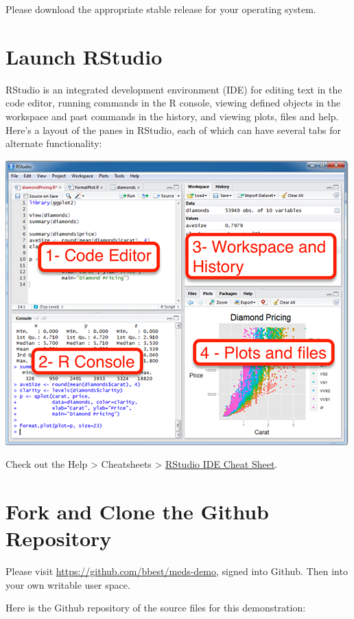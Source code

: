 \documentclass[]{book}
\begin{document}
Please download the appropriate stable release for your operating system.

\hypertarget{launch-rstudio}{%
\section{Launch RStudio}\label{launch-rstudio}}

RStudio is an integrated development environment (IDE) for editing text in the code editor, running commands in the R console, viewing defined objects in the workspace and past commands in the history, and viewing plots, files and help. Here's a layout of the panes in RStudio, each of which can have several tabs for alternate functionality:

\includegraphics{images/rstudio.png}

Check out the Help \textgreater{} Cheatsheets \textgreater{} \href{https://github.com/rstudio/cheatsheets/raw/master/rstudio-ide.pdf}{RStudio IDE Cheat Sheet}.

\hypertarget{fork-and-clone-the-github-repository}{%
\section{Fork and Clone the Github Repository}\label{fork-and-clone-the-github-repository}}

Please visit \url{https://github.com/bbest/meds-demo}, signed into Github. Then into your own writable user space.

Here is the Github repository of the source files for this demonstration:
\end{document}
